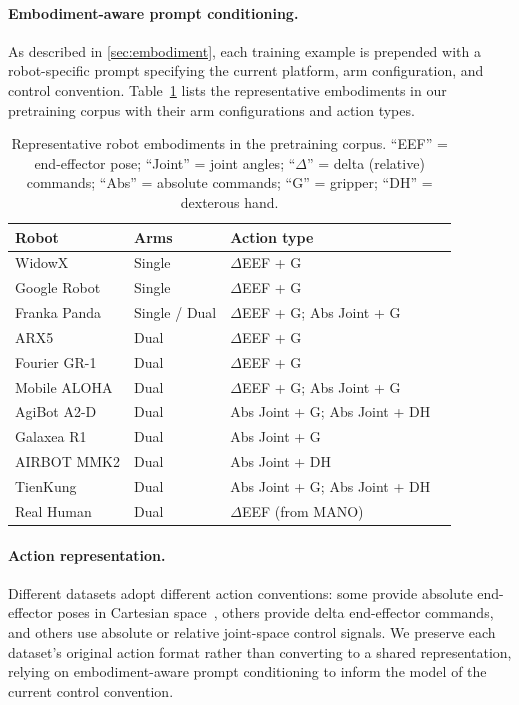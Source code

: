 \paragraph{Embodiment-aware prompt conditioning.}
As described in \cref{sec:embodiment}, each training example is prepended with
a robot-specific prompt specifying the current platform, arm configuration, and
control convention.
Table~\ref{tab:robots} lists the representative embodiments in our pretraining
corpus with their arm configurations and action types.

\begin{table}[h]
\centering
\caption{Representative robot embodiments in the pretraining corpus.
``EEF'' = end-effector pose; ``Joint'' = joint angles;
``$\Delta$'' = delta (relative) commands; ``Abs'' = absolute commands;
``G'' = gripper; ``DH'' = dexterous hand.}
\label{tab:robots}
\setlength{\tabcolsep}{4pt}
\begin{tabular}{llll}
\toprule
\textbf{Robot} & \textbf{Arms} & \textbf{Action type} \\
\midrule
WidowX            & Single & $\Delta$EEF + G \\
Google Robot      & Single & $\Delta$EEF + G \\
Franka Panda      & Single / Dual & $\Delta$EEF + G;\; Abs Joint + G \\
ARX5              & Dual   & $\Delta$EEF + G \\
Fourier GR-1      & Dual   & $\Delta$EEF + G \\
Mobile ALOHA      & Dual   & $\Delta$EEF + G;\; Abs Joint + G \\
AgiBot A2-D       & Dual   & Abs Joint + G;\; Abs Joint + DH \\
Galaxea R1        & Dual   & Abs Joint + G \\
AIRBOT MMK2       & Dual   & Abs Joint + DH \\
TienKung          & Dual   & Abs Joint + G;\; Abs Joint + DH \\
Real Human        & Dual   & $\Delta$EEF (from MANO) \\
\bottomrule
\end{tabular}
\end{table}

\paragraph{Action representation.}
Different datasets adopt different action conventions: some provide absolute
end-effector poses in Cartesian space~\citep{xie2026unifyrobotactionscamera}, others provide delta end-effector
commands, and others use absolute or relative joint-space control signals.
We preserve each dataset's original action format rather than converting to a
shared representation, relying on embodiment-aware prompt conditioning
to inform the model of the current control convention.

